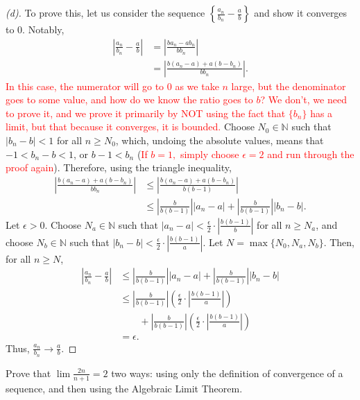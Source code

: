 \documentclass{ximera}
\begin{document}
\begin{proof}[(d)]
    To prove this, let us consider the sequence $\left\{\frac{a_n}{b_n} - \frac{a}b\right\}$ and show it converges to $0$.  Notably, 
    \begin{align}
        \left|\frac{a_n}{b_n} - \frac{a}b\right| &= \left|\frac{ba_n-ab_n}{bb_n}\right|
        \\
        &=
        \left|\frac{b(a_n-a) + a(b-b_n)}{bb_n}\right|.
    \end{align}
    \textcolor{red}{In this case, the numerator will go to $0$ as we take $n$ large, but the denominator goes to some value, and how do we know the ratio goes to $b$?  We don't, we need to prove it, and we prove it primarily by NOT using the fact that $\{b_n\}$ has a limit, but that because it converges, it is bounded.}
    Choose $N_0 \in \mathbb{N}$ such that $|b_n- b| < 1$ for all $n \geq N_0$, which, undoing the absolute values, means that $-1 < b_n-b< 1$, or $b-1 < b_n$ (\textcolor{red}{If $b=1,$ simply choose $\epsilon = 2$ and run through the proof again}).  Therefore, using the triangle inequality,
    \begin{align}
        \left|\frac{b(a_n-a) + a(b-b_n)}{bb_n}\right|
        &\leq
        \left|\frac{b(a_n-a) + a(b-b_n)}{b(b-1)}\right|
        \\
        &\leq \left|\frac{b}{b(b-1)}\right| |a_n-a| + \left|\frac{b}{b(b-1)}\right||b_n-b|.
    \end{align}
Let $\epsilon > 0$.  Choose $N_a \in \mathbb{N}$ such that $|a_n-a| < \frac{\epsilon}2 \cdot \left|\frac{b(b-1)}b\right|$ for all $n \geq N_a$, and choose $N_b \in \mathbb{N}$ such that $|b_n-b| < \frac{\epsilon}2 \cdot \left|\frac{b(b-1)}a\right|$.  Let $N = \max\{N_0, N_a, N_b\}$.  Then, for all $n \geq N$,
\begin{align}
    \left|\frac{a_n}{b_n} - \frac{a}b\right| 
    &\leq 
    \left|\frac{b}{b(b-1)}\right| |a_n-a| + \left|\frac{b}{b(b-1)}\right||b_n-b|
    \\
    &\leq \left|\frac{b}{b(b-1)}\right| \left(\frac{\epsilon}2 \cdot \left|\frac{b(b-1)}a\right|\right)
    \\
    &\qquad + \left|\frac{b}{b(b-1)}\right|\left(\frac{\epsilon}2 \cdot \left|\frac{b(b-1)}a\right|\right)
    \\
    &= \epsilon.
\end{align}
Thus, $\frac{a_n}{b_n} \to \frac{a}b$.
\end{proof}

\begin{exercise}
    Prove that $\lim \frac{2n}{n+1} = 2$ two ways: using only the definition of convergence of a sequence, and then using the Algebraic Limit Theorem. 
\end{exercise}
\end{document}
